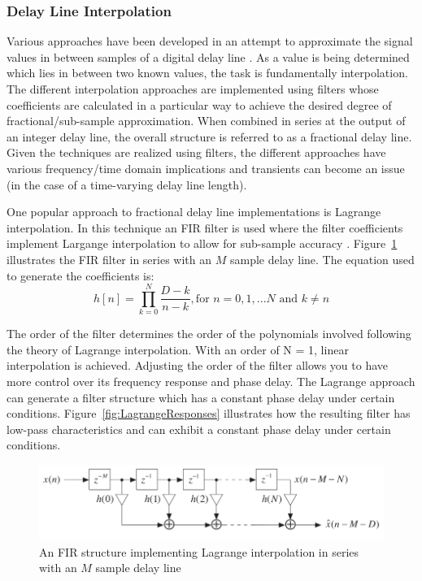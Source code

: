 \documentclass[main.tex]{subfiles}
\begin{document}
\subsubsection{Delay Line Interpolation}
Various approaches have been developed in an attempt to approximate the signal values in between samples of a digital delay line . As a value is being determined which lies in between two known values, the task is fundamentally interpolation. The different interpolation approaches are implemented using filters whose coefficients are calculated in a particular way to achieve the desired degree of fractional/sub-sample approximation. When combined in series at the output of an integer delay line, the overall structure is referred to as a fractional delay line. Given the techniques are realized using filters, the different approaches have various frequency/time domain implications and transients can become an issue (in the case of a time-varying delay line length).

One popular approach to fractional delay line implementations is Lagrange interpolation. In this technique an FIR filter is used where the filter coefficients implement Largange interpolation to allow for sub-sample accuracy . Figure~\ref{fig:LagrangeStructure} illustrates the FIR filter in series with an $M$ sample delay line. The equation used to generate the coefficients is:
\begin{equation}
    h[n] = \prod_{k=0}^{N} \frac{D-k}{n-k}, \text{for } n=0, 1, ... N \text{ and } k \ne n
\end{equation}

The order of the filter determines the order of the polynomials involved following the theory of Lagrange interpolation. With an order of N = 1, linear interpolation is achieved. Adjusting the order of the filter allows you to have more control over its frequency response and phase delay. The Lagrange approach can generate a filter structure which has a constant phase delay under certain conditions. Figure~\ref{fig:LagrangeResponses} illustrates how the resulting filter has low-pass characteristics and can exhibit a constant phase delay under certain conditions.

\begin{figure}[h]
    \centering
    \includegraphics[scale=.65]{./images/diagrams/LagrangeStructure.png}
    \caption{An FIR structure implementing Lagrange interpolation in series with an $M$ sample delay line }
    \label{fig:LagrangeStructure}
\end{figure}
\end{document}
